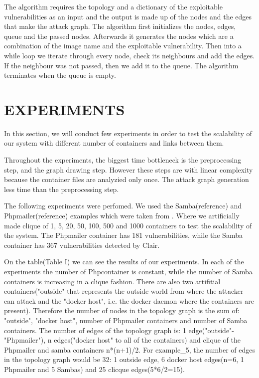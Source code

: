 \documentclass[letterpaper, 10 pt, conference]{ieeeconf}  %
\begin{document}
The algorithm requires the topology and a dictionary of the exploitable vulnerabilities as an input and the output is made up of the nodes and the edges that make the attack graph. 
The algorithm first initializes the nodes, edges, queue and the passed nodes. Afterwards it generates the nodes which are a combination of the image name and the exploitable vulnerability.
Then into a while loop we iterate through every node, check its neighbours and add the edges. If the neighbour was not passed, then we add it to the queue. The algorithm terminates when the queue is empty.

\section{EXPERIMENTS}

In this section, we will conduct few experiments in order to test the scalability of our system with different number of containers and links between them.

Throughout the experiments, the biggest time bottleneck is the preprocessing step, and the graph drawing step. However these steps are with linear complexity because the container files are analyzied only once. The attack graph generation less time than the preprocessing step.

The following experiments were perfomed. We used the Samba(reference) and Phpmailer(reference) examples which were taken from . Where we artificially made clique of 1, 5, 20, 50, 100, 500 and 1000 containers to test the scalability of the system. The Phpmailer container has 181 vulnerabilities, while the Samba container has 367 vulnerabilities detected by Clair.

On the table(Table I) we can see the results of our experiments. In each of the experiments the number of Phpcontainer is constant, while the number of Samba containers is increasing in a clique fashion. There are also two artifitial containers("outside" that represents the outside world from where the attacker can attack and the "docker host", i.e. the docker daemon where the containers are present). Therefore the number of nodes in the topology graph is the sum of: "outside", "docker host", number of Phpmailer containers and number of Samba containers. The number of edges of the topology graph is: 1 edge("outside"-"Phpmailer"), n edges("docker host" to all of the containers) and clique of the Phpmailer and samba containers n*(n+1)/2. For example_5, the number of edges in the topology graph would be 32: 1 outside edge, 6 docker host edges(n=6, 1 Phpmailer and 5 Sambas) and 25 clicque edges(5*6/2=15).
\end{document}
